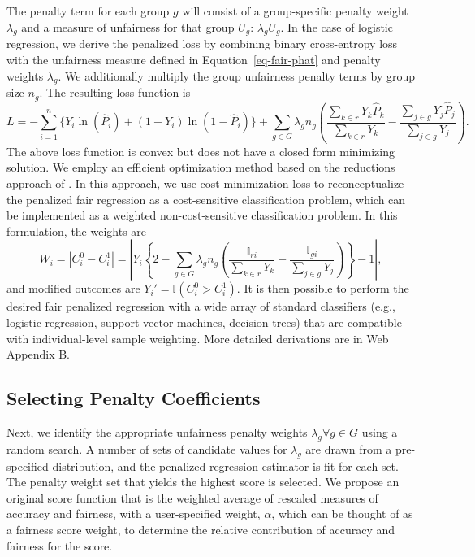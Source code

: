 \documentclass[
  12pt]{article}
\begin{document}
The penalty term for each group \(g\) will consist of a group-specific
penalty weight \(\lambda_g\) and a measure of unfairness for that group
\(U_g\): \(\lambda_g U_g\). In the case of logistic regression, we
derive the penalized loss by combining binary cross-entropy loss with
the unfairness measure defined in Equation~\ref{eq-fair-phat} and
penalty weights \(\lambda_g\). We additionally multiply the group
unfairness penalty terms by group size \(n_g\). The resulting loss
function is \[
L = - \sum_{i=1}^n \{ Y_i\ln(\hat P_i) + (1-Y_i)\ln(1 - \hat P_i) \} + \sum_{g \in G} \lambda_g n_g \left(\frac{\sum_{k\in r}Y_k\hat P_k}{\sum_{k\in r}Y_k} - \frac{\sum_{j\in g}Y_j\hat P_j}{\sum_{j\in g}Y_j} \right). 
\] The above loss function is convex but does not have a closed form
minimizing solution. We employ an efficient optimization method based on
the reductions approach of \citet{agarwal_reductions_2018}. In this
approach, we use cost minimization loss to reconceptualize the penalized
fair regression as a cost-sensitive classification problem, which can be
implemented as a weighted non-cost-sensitive classification problem. In
this formulation, the weights are \[
W_i = |C_i^0 - C_i^1| = \left|Y_i\left \{ 2 - \sum_{g \in G}\lambda_g n_g \left( \frac{\mathbb{I}_{ri}}{\sum_{k\in r}Y_k } - \frac{\mathbb{I}_{gi}}{\sum_{j\in g}Y_j}  \right) \right\} - 1\right|,
\] and modified outcomes are \(Y_i' = \mathbb{I}(C_i^0 > C_i^1)\). It is
then possible to perform the desired fair penalized regression with a
wide array of standard classifiers (e.g., logistic regression, support
vector machines, decision trees) that are compatible with
individual-level sample weighting. More detailed derivations are in Web
Appendix B.

\subsection{Selecting Penalty Coefficients}\label{sec-pen}

Next, we identify the appropriate unfairness penalty weights
\(\lambda_g \forall g \in G\) using a random search. A number of sets of
candidate values for \(\lambda_g\) are drawn from a pre-specified
distribution, and the penalized regression estimator is fit for each
set. The penalty weight set that yields the highest score is selected.
We propose an original score function that is the weighted average of
rescaled measures of accuracy and fairness, with a user-specified
weight, \(\alpha\), which can be thought of as a fairness score weight,
to determine the relative contribution of accuracy and fairness for the
score.
\end{document}
